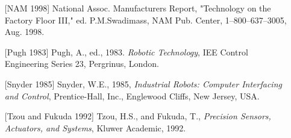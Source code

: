 \documentclass[UTF8,a4paper]{ctexart}
\begin{document}
\begin{enumerate}
    \item[{[NAM 1998]}] National Assoc. Manufacturers Report, "Technology on the Factory Floor III," ed. P.M.Swadimass, NAM Pub. Center, 1–800–637–3005, Aug. 1998.
    \item[{[Pugh 1983]}] Pugh, A., ed., 1983. \textit{Robotic Technology}, IEE Control Engineering Series 23, Pergrinus, London.
    \item[{[Snyder 1985]}] Snyder, W.E., 1985, \textit{Industrial Robots: Computer Interfacing and Control}, Prentice-Hall, Inc., Englewood Cliffs, New Jersey, USA.
    \item[{[Tzou and Fukuda 1992]}] Tzou, H.S., and Fukuda, T., \textit{Precision Sensors, Actuators, and Systems}, Kluwer Academic, 1992.
\end{enumerate}

\ifstandalone
  
\end{document}
